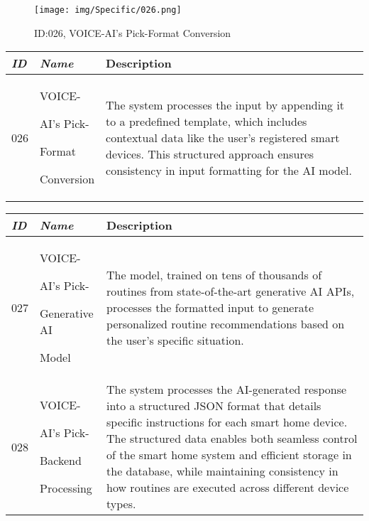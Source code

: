 \documentclass[conference]{IEEEtran}
\begin{document}
\begin{enumerate}[label=\arabic*]
    \vspace{2em}

    \begin{figure}[h]
        \centering
        \texttt{[image: img/Specific/026.png]}
        \caption{ID:026, VOICE-AI's Pick-Format Conversion}
    \end{figure}

    \begin{table}[h]
    \def\arraystretch{1.2} \small
        \begin{tabular}{|p{1cm}|p{1.8cm}|p{4.8cm}|}
        \hline
            \textit{\textbf{ID}} & \textit{\textbf{Name}} & {\textbf{Description}} \\
        \hline
            026 \par & VOICE-\par AI's Pick-\par Format\par Conversion & The system processes the input by appending it to a predefined template, which includes contextual data like the user's registered smart devices. This structured approach ensures consistency in input formatting for the AI model. \\
        \hline
        \end{tabular}
    \end{table}

    \newpage

    \begin{table}[h]
    \def\arraystretch{1.2} \small
        \begin{tabular}{|p{1cm}|p{1.8cm}|p{4.8cm}|}
        \hline
            \textit{\textbf{ID}} & \textit{\textbf{Name}} & {\textbf{Description}} \\
        \hline
            027 \par & VOICE-\par AI's Pick-\par Generative AI\par Model & The model, trained on tens of thousands of routines from state-of-the-art generative AI APIs, processes the formatted input to generate personalized routine recommendations based on the user's specific situation. \\
        \hline
            028 \par & VOICE-\par AI's Pick-\par Backend\par Processing & The system processes the AI-generated response into a structured JSON format that details specific instructions for each smart home device. The structured data enables both seamless control of the smart home system and efficient storage in the database, while maintaining consistency in how routines are executed across different device types. \\
        \hline
        \end{tabular}
    \end{table}


\end{enumerate}
\end{document}
